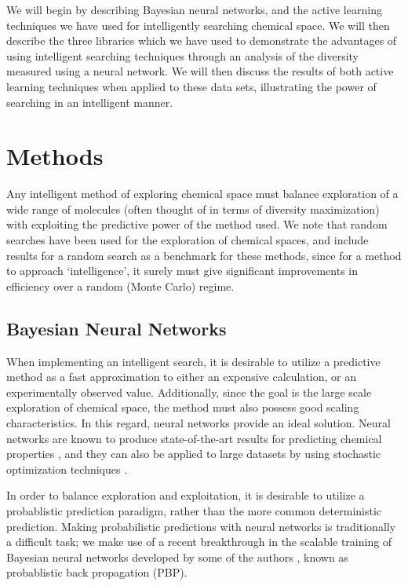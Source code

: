\documentclass{pnastwo}
\begin{document}
\begin{article}
We will begin by describing Bayesian neural networks, and the active learning techniques we have used for intelligently searching chemical  space.  We will then describe the three libraries which we have used to demonstrate the advantages of using intelligent searching techniques through an analysis of the diversity measured using a neural network.  We will then  discuss the results of both active learning techniques when applied to these data sets, illustrating the power of searching in an intelligent manner. 

\section{Methods}

Any intelligent method of exploring chemical space must balance exploration of a wide range of molecules (often thought of in terms of diversity maximization\cite{Blaney_1997,Wang_2009,Fitzgerald_2006,reker_activelearning_2015}) with exploiting the predictive power of the method used. We note that random searches have been used for the exploration of chemical spaces\cite{23548177}, and include results for a random search as a benchmark for these methods, since for a method to approach `intelligence', it surely must give significant improvements in efficiency over a random (Monte Carlo) regime.

\subsection{Bayesian Neural Networks}

When implementing an intelligent search, it is desirable to utilize a predictive method as a fast approximation to either an expensive calculation, or an experimentally observed value.  Additionally, since the goal is the large scale exploration of chemical space, the method must also possess good scaling characteristics.  In this regard, neural networks provide an ideal solution.  Neural networks are known to produce state-of-the-art results for predicting chemical properties \cite{ma2015deep,unterthiner2015toxicity,ramsundar2015massively}, and they can also be applied to large datasets by using stochastic optimization techniques \cite{bousquet2008tradeoffs}. 

In order to balance exploration and exploitation, it is desirable to utilize a probablistic prediction paradigm, rather than the more common deterministic prediction.  Making probabilistic predictions with neural networks is traditionally a difficult task; we make use of a recent breakthrough in the scalable training of Bayesian neural networks developed by some of the authors \cite{hernandez2015probabilistic}, known as probablistic back propagation (PBP). 


\end{article}
\end{document}
